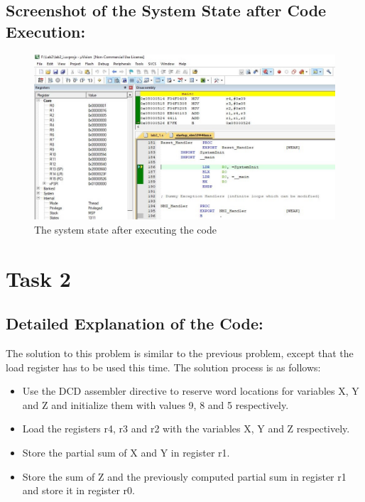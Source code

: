 \documentclass[12pt]{article}
\begin{document}
\subsection{Screenshot of the System State after Code Execution:}
\begin{figure}[ht]
    \centering
    \includegraphics[scale=.7]{images/lab2_ss2.jpg}
    \caption{The system state after executing the code}
    \label{fig:after_task_one}
\end{figure}

\pagebreak

\section{Task 2}

\subsection{Detailed Explanation of the Code:}
The solution to this problem is similar to the previous problem, except that the load register has to be used this time. The solution process is as follows: 
\begin{itemize}
    \item Use the DCD assembler directive to reserve word locations for variables X, Y and Z and initialize them with values 9, 8 and 5 respectively.
    \item Load the registers r4, r3 and r2 with the variables X, Y and Z respectively.
    \item Store the partial sum of X and Y in register r1.
    \item Store the sum of Z and the previously computed partial sum in register r1 and store it in register r0.
\end{itemize}
\end{document}
